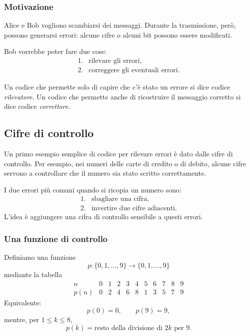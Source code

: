 \documentclass[a4paper]{article}
\begin{document}
\subsubsection{Motivazione}

Alice e Bob vogliono scambiarsi dei messaggi. Durante la trasmissione, però, possono generarsi errori: alcune cifre o alcuni bit possono essere modificati.

Bob vorrebbe poter fare due cose:
\[
    \begin{array}{ll}
        \text{1.} & \text{rilevare gli errori},\\
        \text{2.} & \text{correggere gli eventuali errori}.
    \end{array}
\]

Un codice che permette solo di capire che c'è stato un errore si dice codice \emph{rilevatore}. Un codice che permette anche di ricostruire il messaggio corretto si dice codice \emph{correttore}.

\subsection{Cifre di controllo}

Un primo esempio semplice di codice per rilevare errori è dato dalle cifre di controllo. Per esempio, nei numeri delle carte di credito o di debito, alcune cifre servono a controllare che il numero sia stato scritto correttamente.

I due errori più comuni quando si ricopia un numero sono:
\[
    \begin{array}{ll}
        \text{1.} & \text{sbagliare una cifra},\\
        \text{2.} & \text{invertire due cifre adiacenti}.
    \end{array}
\]
L'idea è aggiungere una cifra di controllo sensibile a questi errori.

\subsubsection{Una funzione di controllo}

Definiamo una funzione
\[
    p:\{0,1,\ldots,9\}\to\{0,1,\ldots,9\}
\]
mediante la tabella
\[
    \begin{array}{c|cccccccccc}
        n & 0 & 1 & 2 & 3 & 4 & 5 & 6 & 7 & 8 & 9\\
        \hline
        p(n) & 0 & 2 & 4 & 6 & 8 & 1 & 3 & 5 & 7 & 9
    \end{array}
\]
Equivalente:
\[
    p(0)=0,
    \qquad
    p(9)=9,
\]
mentre, per \(1\leq k\leq 8\),
\[
    p(k)
    =
    \text{resto della divisione di }2k\text{ per }9.
\]
\end{document}
